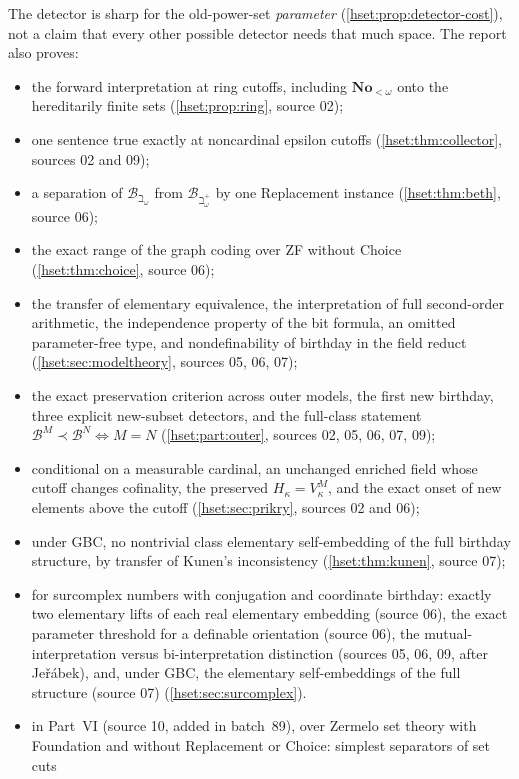 \documentclass[11pt,letterpaper]{article}
\theoremstyle{definition}
\theoremstyle{remark}
\newcommand{\No}{\mathbf{No}}
\newcommand{\B}{\mathcal B}
\begin{document}
The detector is sharp for the old-power-set \emph{parameter}
(\cref{hset:prop:detector-cost}), not a claim that every other possible
detector needs that much space. The report also proves:
\begin{itemize}
\item the forward interpretation at ring cutoffs, including $\No_{<\omega}$
onto the hereditarily finite sets (\cref{hset:prop:ring}, source 02);
\item one sentence true exactly at noncardinal epsilon cutoffs
(\cref{hset:thm:collector}, sources 02 and 09);
\item a separation of $\B_{\beth_\omega}$ from $\B_{\beth_\omega^+}$ by one
Replacement instance (\cref{hset:thm:beth}, source 06);
\item the exact range of the graph coding over ZF without Choice
(\cref{hset:thm:choice}, source 06);
\item the transfer of elementary equivalence, the interpretation of full
second-order arithmetic, the independence property of the bit formula, an
omitted parameter-free type, and nondefinability of birthday in the field
reduct (\cref{hset:sec:modeltheory}, sources 05, 06, 07);
\item the exact preservation criterion across outer models, the first new
birthday, three explicit new-subset detectors, and the full-class statement
$\B^M\prec\B^N\iff M=N$ (\cref{hset:part:outer}, sources 02, 05, 06, 07, 09);
\item conditional on a measurable cardinal, an unchanged enriched field whose
cutoff changes cofinality, the preserved $H_\kappa=V_\kappa^M$, and the exact
onset of new elements above the cutoff (\cref{hset:sec:prikry}, sources 02 and
06);
\item under GBC, no nontrivial class elementary self-embedding of the full
birthday structure, by transfer of Kunen's inconsistency
(\cref{hset:thm:kunen}, source 07);
\item for surcomplex numbers with conjugation and coordinate birthday: exactly
two elementary lifts of each real elementary embedding (source 06), the exact
parameter threshold for a definable orientation (source 06), the
mutual-interpretation versus bi-interpretation distinction (sources 05, 06, 09,
after Je\v{r}\'abek), and, under GBC, the elementary self-embeddings of the full
structure (source 07) (\cref{hset:sec:surcomplex}).
\item in Part~VI (source 10, added in batch~89), over Zermelo set theory with
Foundation and without Replacement or Choice: simplest separators of set cuts

\end{itemize}
\end{document}
